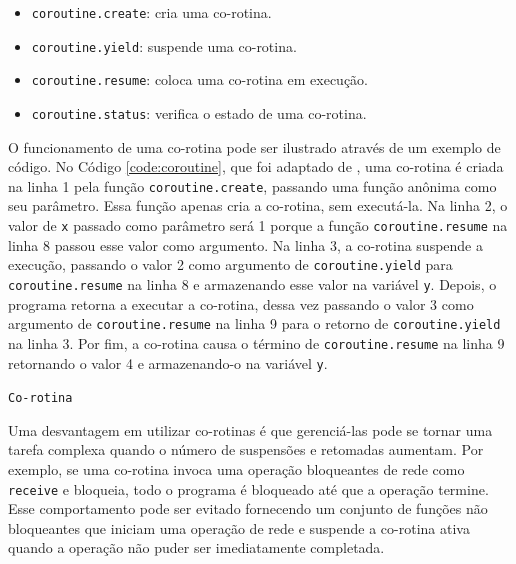 \begin{itemize}
    \item \verb|coroutine.create|: cria uma co-rotina.
    \item \verb|coroutine.yield|: suspende uma co-rotina.
    \item \verb|coroutine.resume|: coloca uma co-rotina em execução.
    \item \verb|coroutine.status|: verifica o estado de uma co-rotina.
\end{itemize}

O funcionamento de uma co-rotina pode ser ilustrado através de um exemplo de código. No Código \ref{code:coroutine}, que foi adaptado de \cite{Ierusalimschy2018:LDL:3289258.3186277}, uma co-rotina é criada na linha 1 pela função \verb|coroutine.create|, passando uma função anônima como seu parâmetro. Essa função apenas cria a co-rotina, sem executá-la. Na linha 2, o valor de \verb|x| passado como parâmetro será 1 porque a função \verb|coroutine.resume| na linha 8 passou esse valor como argumento. Na linha 3, a co-rotina suspende a execução, passando o valor 2 como argumento de \verb|coroutine.yield| para \verb|coroutine.resume| na linha 8 e armazenando esse valor na variável \verb|y|. Depois, o programa retorna a executar a co-rotina, dessa vez passando o valor 3 como argumento de \verb|coroutine.resume| na linha 9 para o retorno de \verb|coroutine.yield| na linha 3. Por fim, a co-rotina causa o término de \verb|coroutine.resume| na linha 9 retornando o valor 4 e armazenando-o na variável \verb|y|.

\begin{center}
 \begin{minipage}{0.7\textwidth}
  \begin{codigo}[H]
   \small
   \caption{\texttt{Co-rotina}}
   \label{code:coroutine}
  \end{codigo}
 \end{minipage}
\end{center}

Uma desvantagem em utilizar co-rotinas é que gerenciá-las pode se tornar uma tarefa complexa quando o número de suspensões e retomadas aumentam. Por exemplo, se uma co-rotina invoca uma operação bloqueantes de rede como \verb|receive| e bloqueia, todo o programa é bloqueado até que a operação termine. Esse comportamento pode ser evitado fornecendo um conjunto de funções não bloqueantes que iniciam uma operação de rede e suspende a co-rotina ativa quando a operação não puder ser imediatamente completada.

